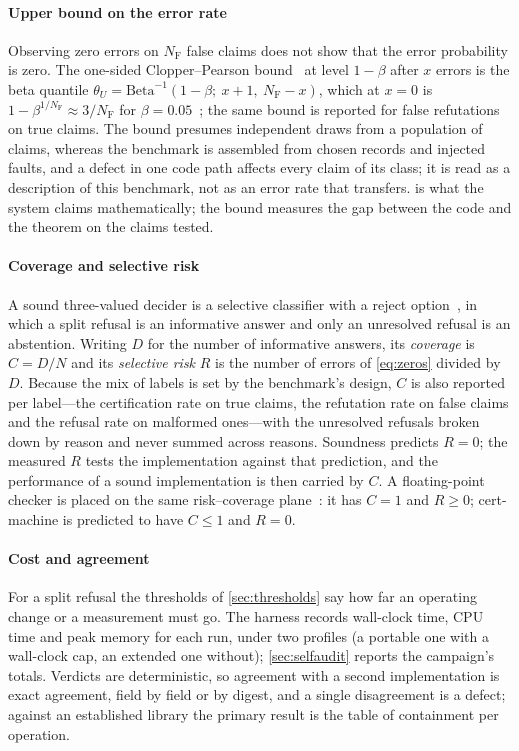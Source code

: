 \documentclass[preprint,11pt,a4paper]{elsarticle}
\theoremstyle{definition}
\begin{document}
\paragraph{Upper bound on the error rate}
Observing zero errors on $N_\text{F}$ false claims does not show that the error probability is zero. The one-sided Clopper--Pearson bound~\citep{ClopperPearson34} at level $1-\beta$ after $x$ errors is the beta quantile $\theta_U=\mathrm{Beta}^{-1}(1-\beta;\ x+1,\ N_\text{F}-x)$, which at $x=0$ is $1-\beta^{1/N_\text{F}}\approx 3/N_\text{F}$ for $\beta=0.05$~\citep{Hanley83}; the same bound is reported for false refutations on true claims. The bound presumes independent draws from a population of claims, whereas the benchmark is assembled from chosen records and injected faults, and a defect in one code path affects every claim of its class; it is read as a description of this benchmark, not as an error rate that transfers.  is what the system claims mathematically; the bound measures the gap between the code and the theorem on the claims tested.

\paragraph{Coverage and selective risk}
A sound three-valued decider is a selective classifier with a reject option~\citep{Chow70,ElYaniv10,Geifman17}, in which a split refusal is an informative answer and only an unresolved refusal is an abstention. Writing $D$ for the number of informative answers, its \emph{coverage} is $C=D/N$ and its \emph{selective risk} $R$ is the number of errors of \cref{eq:zeros} divided by $D$. Because the mix of labels is set by the benchmark's design, $C$ is also reported per label---the certification rate on true claims, the refutation rate on false claims and the refusal rate on malformed ones---with the unresolved refusals broken down by reason and never summed across reasons. Soundness predicts $R=0$; the measured $R$ tests the implementation against that prediction, and the performance of a sound implementation is then carried by $C$. A floating-point checker is placed on the same risk--coverage plane~\citep{ElYaniv10,Franc21}: it has $C=1$ and $R\ge0$; cert-machine is predicted to have $C\le1$ and $R=0$.

\paragraph{Cost and agreement}
For a split refusal the thresholds of \cref{sec:thresholds} say how far an operating change or a measurement must go. The harness records wall-clock time, CPU time and peak memory for each run, under two profiles (a portable one with a wall-clock cap, an extended one without); \cref{sec:selfaudit} reports the campaign's totals. Verdicts are deterministic, so agreement with a second implementation is exact agreement, field by field or by digest, and a single disagreement is a defect; against an established library the primary result is the table of containment per operation.
\end{document}
